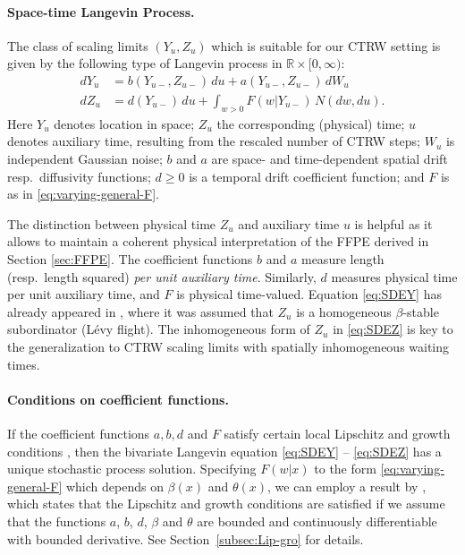 \documentclass[a4paper,12pt]{article}
\numberwithin{equation}{section}
\theoremstyle{plain}
\theoremstyle{definition}
\theoremstyle{remark}
\numberwithin{equation}{section}
\newcommand{\spc}{\mathbb R}
\newcommand{\spctim}{\spc \times [0,\infty)}
\newcommand{\1}{\mathbf 1}
\begin{document}
\paragraph{Space-time Langevin Process.}
The class of scaling limits $(Y_u, Z_u)$ which is suitable for our CTRW setting 
is given by the following type of Langevin process in $\spctim$: 
\begin{align} \label{eq:SDEY}
dY_u &= b(Y_{u-}, Z_{u-})\,du + a(Y_{u-}, Z_{u-})\, dW_u \\
\label{eq:SDEZ}
dZ_u &= d(Y_{u-})\,du + \int_{w > 0} F(w | Y_{u-}) \, N(dw, du).
\end{align}
Here $Y_u$ denotes location in space; $Z_u$ the corresponding (physical) time;
$u$ denotes auxiliary time, resulting from the rescaled number of CTRW steps;
$W_u$ is independent Gaussian noise; $b$ and $a$ are space- and time-dependent
spatial drift resp.\ diffusivity functions; $d \ge 0$ is a temporal drift coefficient function;
and $F$ is as in \eqref{eq:varying-general-F}.

The distinction between physical time $Z_u$ and auxiliary time $u$ is helpful
as it allows to maintain a coherent physical interpretation of the FFPE derived
in Section \ref{sec:FFPE}.  The coefficient functions $b$ and $a$ measure
length (resp.\ length squared) \emph{per unit auxiliary time}.  Similarly,
$d$ measures physical time per unit auxiliary time, and $F$ is physical
time-valued.
Equation \eqref{eq:SDEY} has already appeared in \cite{Weron2008}, where
it was assumed that $Z_u$ is a homogeneous $\beta$-stable subordinator (L\'evy
flight).
The inhomogeneous form of $Z_u$ in \eqref{eq:SDEZ} is key to the generalization
to CTRW scaling limits with spatially inhomogeneous waiting times.



\paragraph{Conditions on coefficient functions.}
If the coefficient functions $a, b, d$ and $F$ satisfy certain local 
Lipschitz and growth conditions \cite[Chapter 6]{Applebaum}, then the bivariate
Langevin equation \eqref{eq:SDEY} -- \eqref{eq:SDEZ} has a unique stochastic 
process solution.  Specifying $F(w|x)$ to the form \eqref{eq:varying-general-F} which depends on 
$\beta(x)$ and $\theta(x)$, we can employ a result by \cite{Tsuchiya1992}, 
which states that the Lipschitz and growth conditions are 
satisfied if we assume that the functions $a$, $b$, $d$, $\beta$ and $\theta$ 
are bounded and continuously differentiable with bounded derivative.
See Section~\ref{subsec:Lip-gro} for details.
\end{document}
